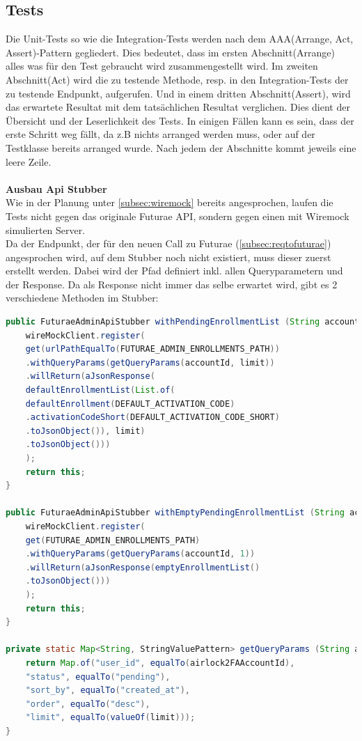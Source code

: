 \subsection{Tests}\label{subsec:testbackend}
Die Unit-Tests so wie die Integration-Tests werden nach dem AAA(Arrange, Act, Assert)-Pattern\cite{AAA} gegliedert. Dies bedeutet, dass im ersten Abschnitt(Arrange) alles was für den Test gebraucht wird zusammengestellt wird. Im zweiten Abschnitt(Act) wird die zu testende Methode, resp. in den Integration-Tests der zu testende Endpunkt, aufgerufen. Und in einem dritten Abschnitt(Assert), wird das erwartete Resultat mit dem tatsächlichen Resultat verglichen. Dies dient der Übersicht und der Leserlichkeit des Tests. In einigen Fällen kann es sein, dass der erste Schritt weg fällt, da z.B nichts arranged werden muss, oder auf der Testklasse bereits arranged wurde. Nach jedem der Abschnitte kommt jeweils eine leere Zeile. \\
\\
\textbf{Ausbau Api Stubber}\label{head:stubber}\\
Wie in der Planung unter \ref{subsec:wiremock} bereits angesprochen, laufen die Tests nicht gegen das originale Futurae API, sondern gegen einen mit Wiremock simulierten Server.\\
Da der Endpunkt, der für den neuen Call zu Futurae (\ref{subsec:reqtofuturae}) angesprochen wird, auf dem Stubber noch nicht existiert, muss dieser zuerst erstellt werden. Dabei wird der Pfad definiert inkl. allen Queryparametern und der Response. Da als Response nicht immer das selbe erwartet wird, gibt es 2 verschiedene Methoden im Stubber:
\begin{lstlisting}[language=Java]
	public FuturaeAdminApiStubber withPendingEnrollmentList (String accountId, int limit) {
	wireMockClient.register(
	get(urlPathEqualTo(FUTURAE_ADMIN_ENROLLMENTS_PATH))
	.withQueryParams(getQueryParams(accountId, limit))
	.willReturn(aJsonResponse(
	defaultEnrollmentList(List.of(
	defaultEnrollment(DEFAULT_ACTIVATION_CODE)
	.activationCodeShort(DEFAULT_ACTIVATION_CODE_SHORT)
	.toJsonObject()), limit)
	.toJsonObject()))
	);
	return this;
}

public FuturaeAdminApiStubber withEmptyPendingEnrollmentList (String accountId) {
	wireMockClient.register(
	get(FUTURAE_ADMIN_ENROLLMENTS_PATH)
	.withQueryParams(getQueryParams(accountId, 1))
	.willReturn(aJsonResponse(emptyEnrollmentList()
	.toJsonObject()))
	);
	return this;
}

private static Map<String, StringValuePattern> getQueryParams (String airlock2FAAccountId, int limit) {
	return Map.of("user_id", equalTo(airlock2FAAccountId),
	"status", equalTo("pending"),
	"sort_by", equalTo("created_at"),
	"order", equalTo("desc"),
	"limit", equalTo(valueOf(limit)));
}
\end{lstlisting}
